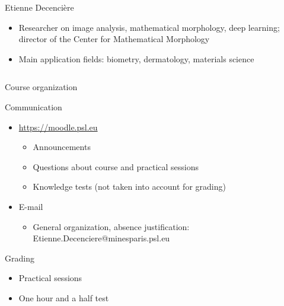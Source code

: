 \documentclass[xcolor=pdftex,dvipsnames,table,mathserif]{beamer}
\begin{document}
{\begin{columns}
\begin{column}{.8\textwidth}
    \begin{block}{Etienne Decencière}
      \scriptsize{
    \begin{itemize}
    \item Researcher on image analysis, mathematical morphology, deep learning; director of the Center for Mathematical Morphology
    \item Main application fields: biometry, dermatology, materials science
    \end{itemize}
    }
  \end{block}

  \end{column}
\end{columns}

}

\begin{frame}{Course organization}

  \begin{block}{Communication}


    \begin{itemize}
    \item \url{https://moodle.psl.eu}
      \begin{itemize}
      \item Announcements
      \item Questions about course and practical sessions
      \item Knowledge tests (not taken into account for grading)
      \end{itemize}
    \item E-mail
      \begin{itemize}
      \item General organization, absence justification: Etienne.Decenciere@minesparis.psl.eu
      \end{itemize}
    \end{itemize}
  \end{block}
\begin{block}{Grading}

    \begin{itemize}
      \item Practical sessions
      \item One hour and a half test
    \end{itemize}
\end{block}

\end{frame}
\end{document}
